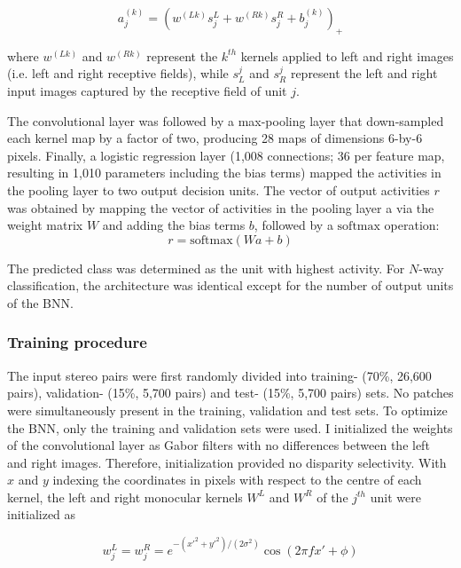 \begin{equation}
  a_j^{(k)}=(w^{(Lk)}s_j^L + w^{(Rk)}s_j^R + b_j^{(k)})_+
\end{equation}

where $w^{(Lk)}$ and $w^{(Rk)}$ represent the $k^{th}$ kernels applied to left and right images (i.e. left and right receptive fields), while $s_L^j$ and $s_R^j$ represent the left and right input images captured by the receptive field of unit $j$. 

The convolutional layer was followed by a max-pooling layer that down-sampled each kernel map by a factor of two, producing 28 maps of dimensions 6-by-6 pixels. Finally, a logistic regression layer (1,008 connections; 36 per feature map, resulting in 1,010 parameters including the bias terms) mapped the activities in the pooling layer to two output decision units. The vector of output activities $r$ was obtained by mapping the vector of activities in the pooling layer a via the weight matrix $W$ and adding the bias terms $b$, followed by a $\mathrm{softmax}$ operation:
\begin{equation}
  r=\mathrm{softmax}(Wa+b)
\end{equation}

The predicted class was determined as the unit with highest activity. For $N$-way classification, the architecture was identical except for the number of output units of the BNN.

\subsubsection*{Training procedure}

The input stereo pairs were first randomly divided into training- (70\%, 26,600 pairs), validation- (15\%, 5,700 pairs) and test- (15\%, 5,700 pairs) sets. No patches were simultaneously present in the training, validation and test sets. To optimize the BNN, only the training and validation sets were used. I initialized the weights of the convolutional layer as Gabor filters with no differences between the left and right images. Therefore, initialization provided no disparity selectivity. With $x$ and $y$ indexing the coordinates in pixels with respect to the centre of each kernel, the left and right monocular kernels $W^L$ and $W^R$ of the $j^{th}$ unit were initialized as

\begin{equation} 
w_j^L = w_j^R = e^{-(x'^2+y'^2)/(2\sigma^2)} \cos⁡(2\pi f x' + \phi)
\end{equation}

